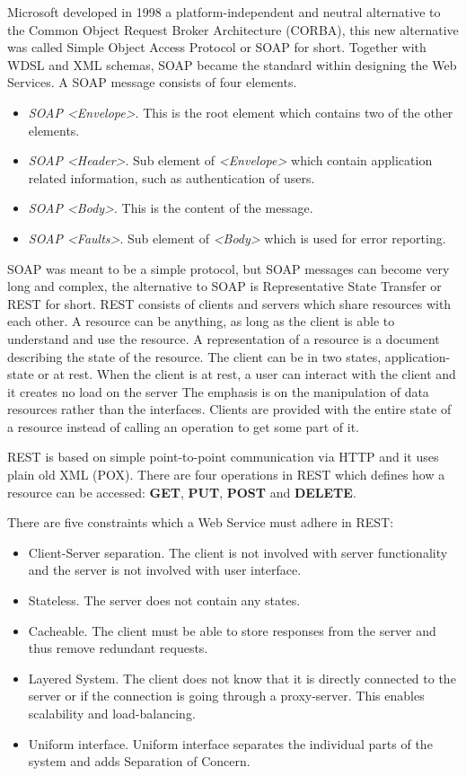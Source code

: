Microsoft developed in 1998 a platform-independent and neutral alternative to the Common Object Request Broker Architecture (CORBA), this new alternative was called Simple Object Access Protocol or SOAP for short.
Together with WDSL and XML schemas, SOAP became the standard within designing the Web Services. A SOAP message consists of four elements.

\begin{itemize}
\item \textit{SOAP <Envelope>}. This is the root element which contains two of the other elements.
\item \textit{SOAP <Header>}. Sub element of \textit{<Envelope>} which contain application related information, such as authentication of users.
\item \textit{SOAP <Body>}. This is the content of the message.
\item \textit{SOAP <Faults>}. Sub element of \textit{<Body>} which is used for error reporting.
\end{itemize}
	
SOAP was meant to be a simple protocol, but SOAP messages can become very long and complex, the alternative to SOAP is Representative State Transfer or REST for short.
REST consists of clients and servers which share resources with each other. A resource can be anything, as long as the client is able to understand and use the resource. A representation of a resource is a document describing the state of the resource. The client can be in two states, application-state or at rest. When the client is at rest, a user can interact with the client and it creates no load on the server
The emphasis is on the manipulation of data resources rather than the interfaces. Clients are provided with the entire state of a resource instead of calling an operation to get some part of it. 

REST is based on simple point-to-point communication via HTTP and it uses plain old XML (POX). There are four operations in REST which defines how a resource can be accessed: \textbf{GET}, \textbf{PUT}, \textbf{POST} and \textbf{DELETE}.


There are five constraints which a Web Service must adhere in REST:
\begin{itemize}
\item Client-Server separation. The client is not involved with server functionality and the server is not involved with user interface.
\item Stateless. The server does not contain any states.
\item Cacheable. The client must be able to store responses from the server and thus remove redundant requests.
\item Layered System. The client does not know that it is directly connected to the server or if the connection is going through a proxy-server. This enables scalability and load-balancing.
\item Uniform interface. Uniform interface separates the individual parts of the system and adds Separation of Concern.
\end{itemize}


